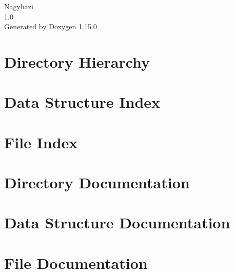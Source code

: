 \documentclass[twoside]{book}
\newcommand{\+}{\discretionary{\mbox{\scriptsize$\hookleftarrow$}}{}{}}
\newcommand{\clearemptydoublepage}{%
    \newpage{\pagestyle{empty}\cleardoublepage}%
  }
\begin{document}
  \raggedbottom
    \hypersetup{pageanchor=false,
                bookmarksnumbered=true,
                pdfencoding=unicode
               }
  \begin{titlepage}
  \vspace*{7cm}
  \begin{center}%
  {\Large Nagyhazi}\\
  [1ex]\large 1.\+0 \\
  \vspace*{1cm}
  {\large Generated by Doxygen 1.15.0}\\
  \end{center}
  \end{titlepage}
  \clearemptydoublepage
  \tableofcontents
  \clearemptydoublepage
  \hypersetup{pageanchor=true}
\chapter{Directory Hierarchy}

\chapter{Data Structure Index}

\chapter{File Index}

\chapter{Directory Documentation}

\chapter{Data Structure Documentation}


\chapter{File Documentation}


















  \backmatter
  \newpage
  \clearemptydoublepage
  \printindex
\end{document}

